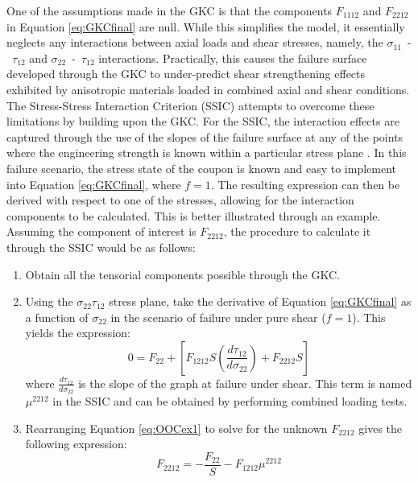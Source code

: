 \documentclass[main.tex]{subfiles}
\begin{document}
One of the assumptions made in the GKC is that the components $F_{1112}$ and $F_{2212}$ in Equation \ref{eq:GKCfinal} are null. While this simplifies the model, it essentially neglects any interactions between axial loads and shear stresses, namely, the $\sigma_{11}$~-~$\tau_{12}$ and $\sigma_{22}$~-~$\tau_{12}$ interactions. Practically, this causes the failure surface developed through the GKC to under-predict shear strengthening effects exhibited by anisotropic materials loaded in combined axial and shear conditions. The Stress-Stress Interaction Criterion (SSIC) attempts to overcome these limitations by building upon the GKC. For the SSIC, the interaction effects are captured through the use of the slopes of the failure surface at any of the points where the engineering strength is known within a particular stress plane \cite{Osswald2017a}. In this failure scenario, the stress state of the coupon is known and easy to implement into Equation \ref{eq:GKCfinal}, where $f=1$. The resulting expression can then be derived with respect to one of the stresses, allowing for the interaction components to be calculated. This is better illustrated through an example. Assuming the component of interest is $F_{2212}$, the procedure to calculate it through the SSIC would be as follows:

\begin{enumerate}
	\item Obtain all the tensorial components possible through the GKC.
	\item Using the $\sigma_{22}$\textendash$\tau_{12}$ stress plane, take the derivative of Equation \ref{eq:GKCfinal} as a function of $\sigma_{22}$ in the scenario of failure under pure shear ($f=1$). This yields the expression:
	\begin{equation} \label{eq:OOCex1}
	0= F_{22}+[F_{1212}S(\frac{d\tau_{12}}{d\sigma_{22}})+F_{2212}S]
	\end{equation}
	where $\frac{d\tau_{12}}{d\sigma_{22}}$  is the slope of the graph at failure under shear. This term is named $\mu^{2212}$ in the SSIC and can be obtained by performing combined loading tests. 
	
	\item Rearranging Equation \ref{eq:OOCex1} to solve for the unknown $F_{2212}$ gives the following expression:
	\begin{equation} \label{eq:OOCex2}
	F_{2212}=-\frac{F_{22}}{S}-F_{1212}\mu^{2212}
	\end{equation}
\end{enumerate}
\end{document}
